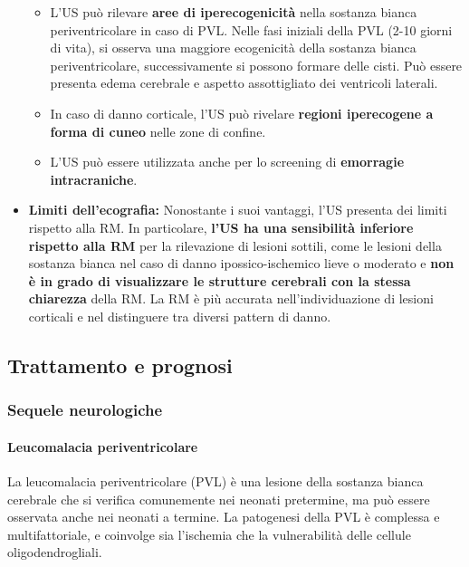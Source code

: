 \begin{itemize}
	\begin{itemize}
		\tightlist
		\item
		L'US può rilevare \textbf{aree di iperecogenicità} nella sostanza bianca periventricolare in caso di PVL. Nelle fasi iniziali della PVL (2-10 giorni di vita), si osserva una maggiore ecogenicità della sostanza bianca periventricolare, successivamente si possono formare delle cisti. Può essere presenta edema cerebrale e aspetto assottigliato dei ventricoli laterali.
		\item
		In caso di danno corticale, l'US può rivelare \textbf{regioni iperecogene a forma di cuneo} nelle zone di confine.
		\item
		L'US può essere utilizzata anche per lo screening di \textbf{emorragie intracraniche}.
	\end{itemize}
	\item
	\textbf{Limiti dell'ecografia:} Nonostante i suoi vantaggi, l'US presenta dei limiti rispetto alla RM. In particolare, \textbf{l'US ha una sensibilità inferiore rispetto alla RM} per la rilevazione di lesioni sottili, come le lesioni della sostanza bianca nel caso di danno ipossico-ischemico lieve o moderato e \textbf{non è in grado di visualizzare le strutture cerebrali con la stessa chiarezza} della RM. La RM è più accurata nell'individuazione di lesioni corticali e nel distinguere tra diversi pattern di danno.
\end{itemize}

\subsection{Trattamento e prognosi}

\subsubsection{Sequele neurologiche}

\paragraph{Leucomalacia periventricolare} La leucomalacia periventricolare (PVL) è una lesione della sostanza bianca cerebrale che si verifica comunemente nei neonati pretermine, ma può essere osservata anche nei neonati a termine. La patogenesi della PVL è complessa e multifattoriale, e coinvolge sia l'ischemia che la vulnerabilità delle cellule oligodendrogliali.

